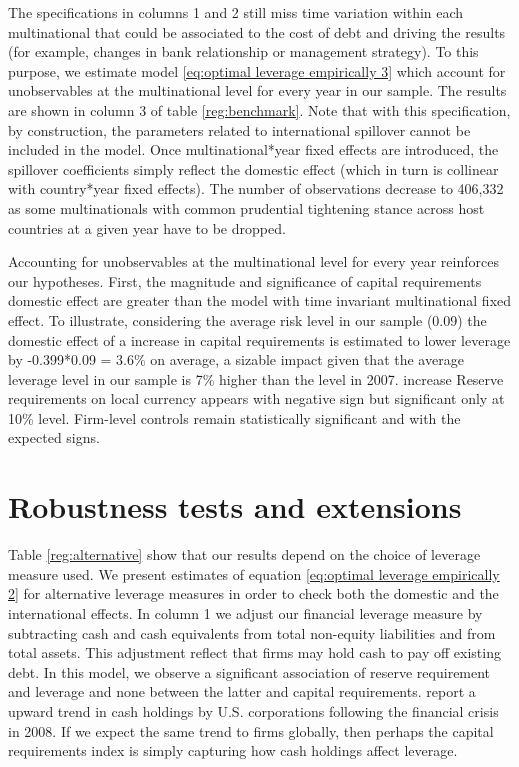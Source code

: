 \documentclass[12pt]{article}
\begin{document}
	  The specifications in columns 1 and 2 still miss time variation within each multinational that could be associated to the cost of debt and driving the results (for example, changes in bank relationship or management strategy). To this purpose, we estimate model \ref{eq:optimal leverage empirically 3} which account for unobservables at the multinational level for every year in our sample. The results are shown in column 3 of table \ref{reg:benchmark}. Note that with this specification, by construction, the parameters related to international spillover cannot be included in the model. Once multinational*year fixed effects are introduced, the spillover coefficients simply reflect the domestic effect (which in turn is collinear with country*year fixed effects). The number of observations decrease to 406,332 as some multinationals with common prudential tightening stance across host countries at a given year have to be dropped.
	  
	   Accounting for unobservables at the multinational level for every year reinforces our hypotheses. First, the magnitude and significance of capital requirements domestic effect are greater than the model with time invariant multinational fixed effect. To illustrate, considering the average risk level in our sample (0.09) the domestic effect of a increase in capital requirements is estimated to lower leverage by -0.399*0.09 = 3.6\% on average, a sizable impact given that the average leverage level in our sample is 7\% higher than the level in 2007. increase Reserve requirements on local currency appears with negative sign but significant only at 10\% level. Firm-level controls remain statistically significant and with the expected signs. 
	  
	\section{Robustness tests and extensions} \label{sec:robustness}
	Table \ref{reg:alternative} show that our results depend on the choice of leverage measure used. We present estimates of equation \ref{eq:optimal leverage empirically 2} for alternative leverage measures in order to check both the domestic and the international effects. In column 1 we adjust our financial leverage measure by subtracting cash and cash equivalents from total non-equity liabilities and from total assets. This adjustment reflect that firms may hold cash to pay off existing debt. In this model, we observe a significant association of reserve requirement and leverage and none between the latter and capital requirements. \cite*{sanchez2013corporations} report a upward trend in cash holdings by U.S. corporations following the financial crisis in 2008. If we expect the same trend to firms globally, then perhaps the capital requirements index is simply capturing how cash holdings affect leverage.  
	
\end{document}
